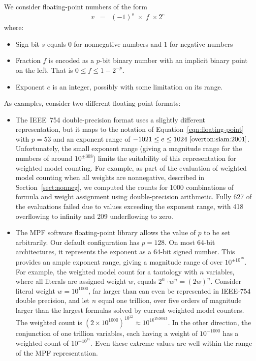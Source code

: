 \documentclass[letterpaper,USenglish,cleveref, autoref, thm-restate]{lipics-v2021}
\begin{document}
We consider floating-point numbers of the form
\begin{eqnarray}
v & = & (-1)^s \; \times \; f \; \times 2^{e} \label{eqn:floating-point}
\end{eqnarray}
where:
\begin{itemize}
\item Sign bit $s$ equals $0$ for nonnegative numbers and $1$ for negative numbers
\item Fraction $f$ is encoded as a $p$-bit binary number with an implicit binary point on the left.  That is $0 \leq f \leq 1-2^{-p}$.
\item Exponent $e$ is an integer, possibly with some limitation on its range.
\end{itemize}
As examples, consider two different floating-point formats:
\begin{itemize}
\item The IEEE~754 double-precision format uses a slightly different
  representation, but it maps to the notation of
  Equation~\ref{eqn:floating-point} with $p=53$ and an exponent range
  of $-1021 \leq e \leq 1024~\cite{overton:siam:2001}$.
  Unfortunately, the small exponent range (giving a magnitude range
  for the numbers of around $10^{\pm 308}$) limits the suitability of
  this representation for weighted model counting.  For example, as
  part of the evaluation of weighted model counting when all weights
  are nonnegative, described in Section~\ref{sect:nonneg}, we computed
  the counts for 1000 combinations of formula and weight assignment
  using double-precision arithmetic.
  Fully 627 of the evaluations failed due to values exceeding the exponent range,
  with 418 overflowing to infinity and 209 underflowing to zero.
\item The MPF software floating-point library allows the value of $p$
  to be set arbitrarily.  Our default configuration has $p=128$. On
  most 64-bit architectures, it represents the exponent as a 64-bit
  signed number.  This provides an ample exponent range, giving a
  magnitude range of over $10^{\pm 10^{18}}$.
  For example, the weighted model count for a tautology with $n$ variables, where all literals are assigned weight $w$, equals
  $2^n\cdot w^n = (2w)^n$.  Consider literal weight $w=10^{1000}$,
 far larger than can even be represented in IEEE-754 double precision, and let $n$ equal one trillion, over five orders of magnitude
 larger than the largest formulas solved by current weighted model counters.  The weighted count is
 $(2 \times 10^{1000})^{10^{12}} \approx 10^{10^{15.00013}}$.  In the other direction, the conjunction of one trillion variables, each having a weight
 of $10^{-1000}$ has a weighted count of $10^{-10^{15}}$.  Even these extreme values are
 well within the range of the MPF representation.
\end{itemize}
\end{document}
